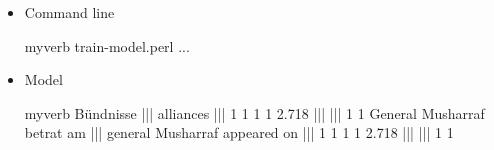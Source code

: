 \documentclass[landscape]{uedslides2C}
\begin{document}

% 
% 

%
%
%
%

\vspace{20mm}
\begin{itemize}
\item Command line
\begin{center}
\begin{SaveVerbatim}{myverb}
train-model.perl ...
\end{SaveVerbatim}
\colorbox{gray}{}
\end{center}

\item Model
\begin{center}
\footnotesize
\begin{SaveVerbatim}{myverb}
Bündnisse ||| alliances ||| 1 1 1 1 2.718 ||| ||| 1 1
General Musharraf betrat am ||| general Musharraf appeared on ||| 1 1 1 1 2.718 ||| ||| 1 1

\end{SaveVerbatim}
\colorbox{gray}{}
\end{center}
\end{itemize}

\end{document}
